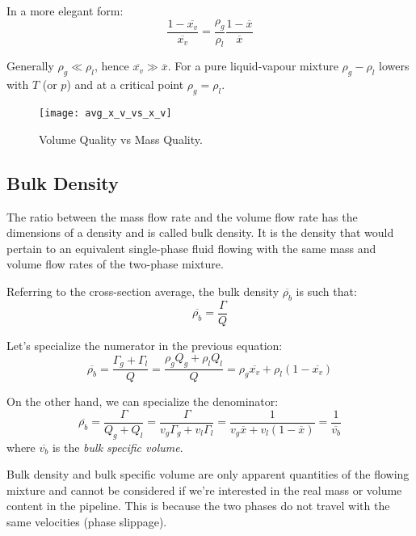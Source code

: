 In a more elegant form:
\begin{equation*}
    \frac{1-\overline{x_v}}{\overline{x_v}} = \frac{\rho_g}{\rho_l}\frac{1-\overline{x}}{\overline{x}}
\end{equation*}

Generally $\rho_g \ll \rho_l$, hence $\overline{x_v} \gg \overline{x}$. For a
pure liquid-vapour mixture $\rho_g-\rho_l$ lowers with $T$ (or $p$) and at a
critical point $\rho_g=\rho_l$.

\begin{figure}[htp]
    \centering
    \texttt{[image: avg\_x\_v\_vs\_x\_v]}
    \caption{Volume Quality vs Mass Quality.}
\end{figure}

\subsection{Bulk Density}
The ratio between the mass flow rate and the volume flow rate has the dimensions
of a density and is called bulk density. It is the density that would pertain to
an equivalent single-phase fluid flowing with the same mass and volume flow
rates of the two-phase mixture.

Referring to the cross-section average, the bulk density $\overline{\rho_b}$ is
such that:
\begin{equation*}
    \overline{\rho_b} = \frac{\Gamma}{Q}
\end{equation*}

Let's specialize the numerator in the previous equation:
\begin{equation*}
    \overline{\rho_b} = \frac{\Gamma_g + \Gamma_l}{Q} = \frac{\rho_gQ_g + \rho_lQ_l}{Q} = \rho_g\overline{x_v}+\rho_l(1-\overline{x_v})
\end{equation*}

On the other hand, we can specialize the denominator:
\begin{equation*}
    \overline{\rho_b} = \frac{\Gamma}{Q_g+Q_l} = \frac{\Gamma}{v_g\Gamma_g+v_l\Gamma_l} = \frac{1}{v_g\overline{x}+v_l(1-\overline{x})} = \frac{1}{\overline{v_b}}
\end{equation*}
where $\overline{v_b}$ is the \emph{bulk specific volume}.

Bulk density and bulk specific volume are only apparent quantities of the
flowing mixture and cannot be considered if we're interested in the real mass or
volume content in the pipeline. This is because the two phases do not travel
with the same velocities (phase slippage).

